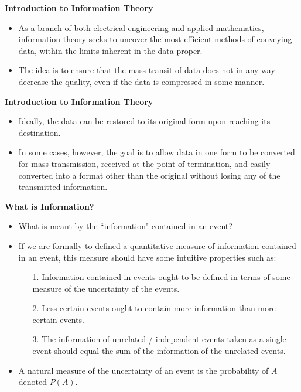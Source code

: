 \documentclass[]{article}
\begin{document}
\noindent \textbf{Introduction to Information Theory}
\begin{itemize}

\item As a branch of both electrical engineering and applied mathematics, information theory seeks to uncover the most efficient 
methods of conveying data, within the limits inherent in the data proper. \item The idea is to ensure that the mass transit of data does 
not in any way decrease the quality, even if the data is compressed in some manner. 
\end{itemize}


\noindent \textbf{Introduction to Information Theory}
\begin{itemize}
\item Ideally, the data can be restored to its original form upon reaching its destination. 
\item In some cases, however, the goal is to allow data in one form to be converted for mass transmission, 
received at the point of termination, and easily converted into a format other than the original without losing any of the transmitted information.
\end{itemize}


{
\noindent \textbf{What is Information?}

\begin{itemize} \item  What is meant by the ``information" contained in an event?
\item If we are formally to defined a quantitative measure of information contained in an event, this measure should have some intuitive properties such as:
\begin{itemize} \item [1.] Information contained in events ought to be defined in terms of some measure of the uncertainty of the events.
\item [2.] Less certain events ought to contain more information than more certain events.
\item [3.] The information of unrelated / independent events taken as a single event should equal the sum of the information of the unrelated events.
\end{itemize}

\item A natural measure of the uncertainty of an event is the probability of $A$ denoted $P(A)$.
\end{itemize}
}
\end{document}
